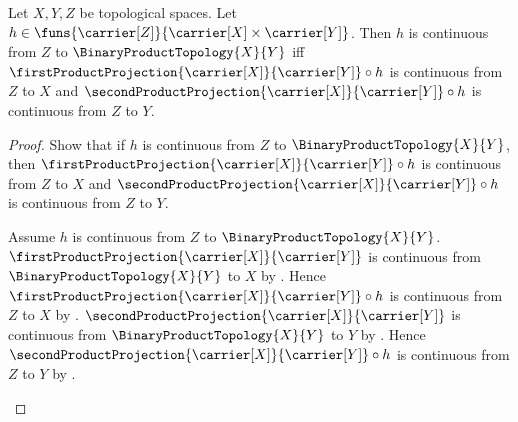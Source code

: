 \begin{theorem}\label{binary_product_topology_universal_property}
    Let $X,Y,Z$ be topological spaces.
    Let $h\in\funs{\carrier[Z]}{
        \carrier[X]\times\carrier[Y]}$.
    Then $h$ is continuous from $Z$ to $\BinaryProductTopology{X}{Y}$ iff
        $\firstProductProjection{\carrier[X]}{\carrier[Y]}\circ h$
            is continuous from $Z$ to $X$ and
        $\secondProductProjection{\carrier[X]}{\carrier[Y]}\circ h$
            is continuous from $Z$ to $Y$.
\end{theorem}
\begin{proof}
    Show that if $h$ is continuous from $Z$ to
        $\BinaryProductTopology{X}{Y}$, then
        $\firstProductProjection{\carrier[X]}{\carrier[Y]}\circ h$
            is continuous from $Z$ to $X$ and
        $\secondProductProjection{\carrier[X]}{\carrier[Y]}\circ h$
            is continuous from $Z$ to $Y$.
    \begin{subproof}
        Assume $h$ is continuous from $Z$ to
            $\BinaryProductTopology{X}{Y}$.
        $\firstProductProjection{\carrier[X]}{\carrier[Y]}$ is continuous
            from $\BinaryProductTopology{X}{Y}$ to $X$ by
            .
        Hence $\firstProductProjection{\carrier[X]}{\carrier[Y]}\circ h$
            is continuous from $Z$ to $X$ by
            .
        $\secondProductProjection{\carrier[X]}{\carrier[Y]}$ is continuous
            from $\BinaryProductTopology{X}{Y}$ to $Y$ by
            .
        Hence $\secondProductProjection{\carrier[X]}{\carrier[Y]}\circ h$
            is continuous from $Z$ to $Y$ by
            .
    \end{subproof}


\end{proof}

